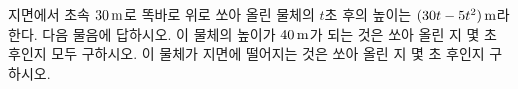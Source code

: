 지면에서 초속 $30\mkern3mu \mathrm{m}$로 똑바로 위로 쏘아 올린 물체의 $t$초 후의 높이는 $(30t-5t^2)\mkern3mu \mathrm{m}$라 한다. 다음 물음에 답하시오.
 이 물체의 높이가 $40\mkern3mu \mathrm{m}$가 되는 것은 쏘아 올린 지 몇 초 후인지 모두 구하시오.
 이 물체가 지면에 떨어지는 것은 쏘아 올린 지 몇 초 후인지 구하시오.
